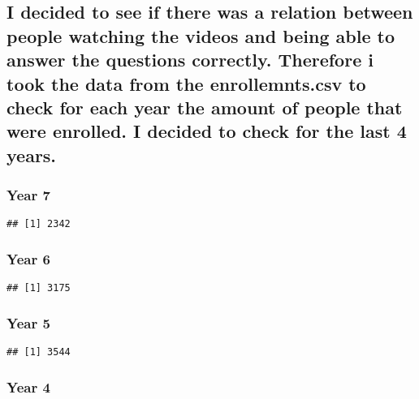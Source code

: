 \documentclass[
]{article}
\begin{document}
\hypertarget{i-decided-to-see-if-there-was-a-relation-between-people-watching-the-videos-and-being-able-to-answer-the-questions-correctly.-therefore-i-took-the-data-from-the-enrollemnts.csv-to-check-for-each-year-the-amount-of-people-that-were-enrolled.-i-decided-to-check-for-the-last-4-years.}{%
\subsection{I decided to see if there was a relation between people
watching the videos and being able to answer the questions correctly.
Therefore i took the data from the enrollemnts.csv to check for each
year the amount of people that were enrolled. I decided to check for the
last 4
years.}\label{i-decided-to-see-if-there-was-a-relation-between-people-watching-the-videos-and-being-able-to-answer-the-questions-correctly.-therefore-i-took-the-data-from-the-enrollemnts.csv-to-check-for-each-year-the-amount-of-people-that-were-enrolled.-i-decided-to-check-for-the-last-4-years.}}

\hypertarget{year-7}{%
\subsubsection{Year 7}\label{year-7}}

\begin{verbatim}
## [1] 2342
\end{verbatim}

\hypertarget{year-6}{%
\subsubsection{Year 6}\label{year-6}}

\begin{verbatim}
## [1] 3175
\end{verbatim}

\hypertarget{year-5}{%
\subsubsection{Year 5}\label{year-5}}

\begin{verbatim}
## [1] 3544
\end{verbatim}

\hypertarget{year-4}{%
\subsubsection{Year 4}\label{year-4}}
\end{document}
